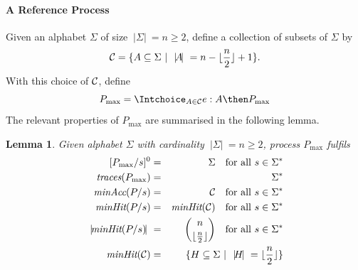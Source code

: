 \documentclass[3p,times]{elsarticle}
\newcommand{\trc}{\text{\it traces}}
\newcommand{\minaccs}{\text{\it minAcc}}
\newcommand{\minhits}{\text{\it minHit}}
\newcommand{\card}[1]{{~|\! #1\!|~}}
\newcommand{\pmax}{P_\text{max}}
\newtheorem{lemma}{Lemma}
\begin{document}
\paragraph{A Reference Process} Given an alphabet $\Sigma$ of size $\card{\Sigma} =
n\ge 2$, define a collection of subsets of $\Sigma$ by
\begin{equation}\label{eq:defC}
  {\cal C} = \{ A\subseteq\Sigma~|~\card{A} = n - \lfloor\frac{n}{2}\rfloor + 1 \}.
\end{equation}
%
With this choice of ${\cal C}$, define
\begin{equation}\label{eq:pmax}
  \pmax = \Intchoice_{A\in{\cal C}} e:A\then \pmax
\end{equation}
%
The relevant properties of $\pmax$ are summarised in the following lemma.
%
\begin{lemma}\label{lemma:pmax}
  Given alphabet $\Sigma$ with cardinality $\card{\Sigma} = n\ge 2$,
  process $\pmax$ fulfils
  \begin{eqnarray}
  {}[\pmax/s]^0 & = & \Sigma \quad\text{for all $s\in \Sigma^*$}
  \label{eq:pmaxa}
  \\
  \trc(\pmax) & = & \Sigma^*
  \label{eq:pmaxb}
  \\
  \minaccs(P/s) & = & {\cal C} \quad\text{for all $s\in \Sigma^*$}
  \label{eq:pmaxc}
  \\
  \minhits(P/s) & = & \minhits({\cal C}) \quad\text{for all $s\in \Sigma^*$}
  \label{eq:pmaxe}
  \\
  \card{\minhits(P/s)} & = & \binom{n}{\lfloor\frac{n}{2}\rfloor}
  \quad \text{for all $s\in \Sigma^*$}
  \label{eq:pmaxd}
  \\
  \minhits({\cal C})  & = & \{ H\subseteq \Sigma~|~\card{H} = \lfloor\frac{n}{2}\rfloor\}
  \label{eq:pmaxf}
  \end{eqnarray}
\end{lemma}
\end{document}
